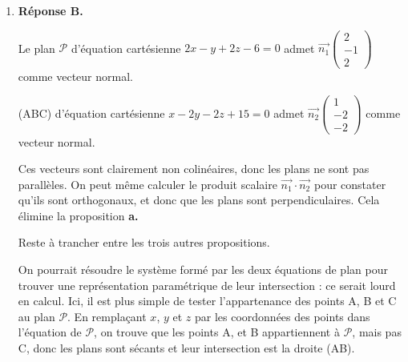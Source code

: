 \documentclass[10pt]{article}
\providecommand{\vect}[1]{\overrightarrow{#1}}
\begin{document}
\begin{enumerate}
\begin{multicols}{2}
$(S) \iff  \left\{\begin{array}{l} t = -2\\s=1\\s=-10 \end{array}\right.$
	\end{multicols}

Ce système n'a pas de solution, donc les droites n'ont aucun point commun et ne sont pas parallèles : elles sont donc non coplanaires.

\item \textbf{Réponse B.}

Le plan $\mathcal{P}$ d'équation cartésienne $2 x-y+2 z-6=0$ admet $\vect{n_1} \begin{pmatrix}	2\\-1\\2\end{pmatrix}$ comme vecteur normal.

(ABC) d'équation cartésienne $x-2 y-2 z+15=0$ admet $\vect{n_2} \begin{pmatrix}1\\-2\\-2\end{pmatrix}$ comme vecteur normal.

Ces vecteurs sont clairement non colinéaires, donc les plans ne sont pas parallèles. On peut même calculer le produit scalaire $\vect{n_1}\cdot\vect{n_2}$ pour constater qu'ils sont orthogonaux, et donc que les plans sont perpendiculaires. Cela élimine la proposition \textbf{a.}

Reste à trancher entre les trois autres propositions.

On pourrait résoudre le système formé par les deux équations de plan pour trouver une représentation paramétrique de leur intersection : ce serait lourd en calcul. Ici, il est plus simple de tester l'appartenance des points A, B et C au plan $\mathcal{P}$. En remplaçant $x$, $y$ et $z$ par les coordonnées des points dans l'équation de $\mathcal{P}$, on trouve que les points A, et B appartiennent à $\mathcal{P}$, mais pas C, donc les plans sont sécants et leur intersection est la droite (AB).
	\end{enumerate}

\bigskip
\end{document}

